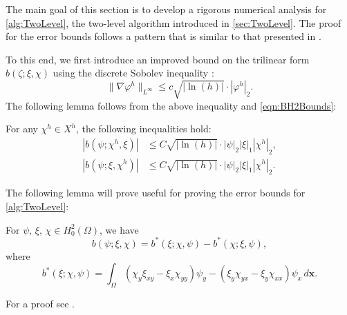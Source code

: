 The main goal of this section is to develop a rigorous numerical analysis for
\autoref{alg:TwoLevel}, the two-level algorithm introduced in
\autoref{sec:TwoLevel}. The proof for the error bounds follows a pattern that is
similar to that presented in \cite{Fairag98}.

To this end, we first introduce an improved bound on the trilinear form
$b(\zeta; \xi, \chi)$ using the discrete Sobolev inequality
\cite{Ciarlet,Fairag98}:
\begin{equation*}
  \|\nabla \varphi^h\|_{L^{\infty}} \le c \sqrt{|\ln(h)|}\cdot |\varphi^h|_2.
\end{equation*}
The following lemma follows from the above inequality and \eqref{eqn:BH2Bounds}:
\begin{lemma} \label{lma:bImproved}
  For any $\chi^h\in X^h$, the following inequalities hold:
  \begin{align*}
    |b(\psi;\chi^h,\xi)| &\le C\sqrt{|\ln(h)|} \cdot |\psi|_2 |\xi|_1 |\chi^h|_2, \\
    |b(\psi;\xi,\chi^h)| &\le C\sqrt{|\ln(h)|} \cdot |\psi|_2 |\xi|_1 |\chi^h|_2.
  \end{align*}
\end{lemma}
The following lemma will prove useful for proving the error bounds for
\autoref{alg:TwoLevel}:
\begin{lemma} \label{lma:trilinear}
  For $\psi,\,\xi,\,\chi\in H^2_0(\Omega)$, we have
  \begin{equation}
    b(\psi; \xi, \chi) = b^*(\xi; \chi, \psi) - b^*(\chi; \xi, \psi),
    \label{eqn:eqn:trilinear}
  \end{equation}
  where
  \begin{equation}
    b^*(\xi; \chi, \psi) = \int_{\Omega}\! (\chi_y\xi_{xy}-\xi_x\chi_{yy}) \psi_y -
    (\xi_y\chi_{yx}-\xi_y\chi_{xx}) \psi_x \,d\mathbf{x}.
    \label{eqn:trilinear}
  \end{equation}
\end{lemma}
For a proof see \cite{Fairag98}.

